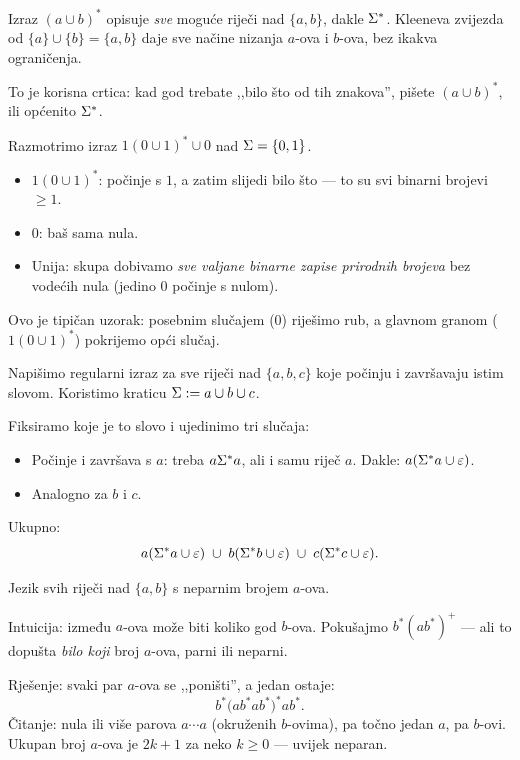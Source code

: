 \begin{primjer}
Izraz $(a \cup b)^*$ opisuje \emph{sve} moguće riječi nad $\{a, b\}$,
dakle $\Sigma^*$. Kleeneva zvijezda od $\{a\} \cup \{b\} = \{a,b\}$
daje sve načine nizanja $a$-ova i $b$-ova, bez ikakva ograničenja.

To je korisna crtica: kad god trebate ,,bilo što od tih znakova'',
pišete $(a \cup b)^*$, ili općenito $\Sigma^*$.
\end{primjer}

\begin{primjer}
Razmotrimo izraz $1(0 \cup 1)^* \cup 0$ nad $\Sigma = \{0, 1\}$.
\begin{itemize}
  \item $1(0 \cup 1)^*$: počinje s $1$, a zatim slijedi bilo što ---
        to su svi binarni brojevi $\geq 1$.
  \item $0$: baš sama nula.
  \item Unija: skupa dobivamo \emph{sve valjane binarne zapise prirodnih
        brojeva} bez vodećih nula (jedino $0$ počinje s nulom).
\end{itemize}
Ovo je tipičan uzorak: posebnim slučajem ($0$) riješimo rub,
a glavnom granom ($1(0\cup1)^*$) pokrijemo opći slučaj.
\end{primjer}

\begin{primjer}
Napišimo regularni izraz za sve riječi nad $\{a, b, c\}$ koje
počinju i završavaju istim slovom. Koristimo kraticu $\Sigma := a \cup b \cup c$.

Fiksiramo koje je to slovo i ujedinimo tri slučaja:
\begin{itemize}
  \item Počinje i završava s $a$: treba $a \Sigma^* a$, ali i samu riječ $a$.
        Dakle: $a(\Sigma^* a \cup \varepsilon)$.
  \item Analogno za $b$ i $c$.
\end{itemize}
Ukupno:
\[
  a(\Sigma^* a \cup \varepsilon) \;\cup\; b(\Sigma^* b \cup \varepsilon) \;\cup\; c(\Sigma^* c \cup \varepsilon).
\]
\end{primjer}

\begin{primjer}
Jezik svih riječi nad $\{a,b\}$ s neparnim brojem $a$-ova.

Intuicija: između $a$-ova može biti koliko god $b$-ova. Pokušajmo
$b^* (ab^*)^+$ --- ali to dopušta \emph{bilo koji} broj $a$-ova, parni ili neparni.

Rješenje: svaki par $a$-ova se ,,poništi'', a jedan ostaje:
\[
  b^* \bigl(ab^* ab^*\bigr)^* ab^*.
\]
Čitanje: nula ili više parova $a \cdots a$ (okruženih $b$-ovima),
pa točno jedan $a$, pa $b$-ovi. Ukupan broj $a$-ova je $2k + 1$ za neko
$k \geq 0$ --- uvijek neparan.
\end{primjer}

